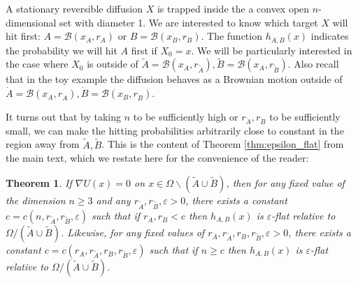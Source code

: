 \documentclass[12pt, nofootinbib,english, amsmath, amssymb, aps, priprint, graphicx,floatfix]{revtex4-1}
\newtheorem{theorem}{Theorem}
\theoremstyle{plain}
\theoremstyle{definition}
\theoremstyle{plain}
\newcommand{\bb}[1]{\mathcal{B}\left(#1\right)}
\newcommand{\dA}{{\dot A}}
\newcommand{\tA}{{\tilde A}}
\newcommand{\dB}{{\dot B}}
\newcommand{\tB}{{\tilde B}}
\begin{document}
A stationary reversible diffusion $X$ is trapped inside the a convex open $n$-dimensional set with diameter 1.  We are interested to know which target $X$ will hit first: $A=\bb{x_A,r_A}$ or $B=\bb{x_B,r_B}$.  The function $h_{A,B}(x)$ indicates the probability we will hit $A$ first if $X_0=x$.  We will be particularly interested in the case where $X_0$ is outside of $\tilde A=\bb{x_A,r_{\tilde A}},\tilde B=\bb{x_A,r_{\tilde B}}$.  Also recall that in the toy example the diffusion behaves as a Brownian motion outside of $\dot A=\bb{x_A,r_{\dot A}},\dot B=\bb{x_B,r_{\dot B}}$.  

It turns out that by taking $n$ to be sufficiently high or $r_{\dot A},r_{\dot B}$ to be sufficiently small, we can make the hitting probabilities arbitrarily close to constant in the region away from $\tilde A,\tilde B$.  This is the content of Theorem \ref{thm:epsilon_flat} from the main text, which we restate here for the convenience of the reader:

\begingroup
\def\thetheorem{\ref{thm:epsilon_flat}}
\begin{theorem}  
If $\nabla U(x)=0$ on $x\in\Omega\backslash(\tA\cup\tB)$, then
for any fixed value of the dimension $n \geq 3$ and any $r_{\tilde{A}}, r_{\tilde{B}}, \varepsilon > 0$, there exists a constant $c=c(n, r_{\tilde{A}}, r_{\tilde{B}}, \varepsilon)$ such that if $r_{\dA}, r_{\dB} < c$ then 
$h_{A,B}(x)$ is 
$\varepsilon$-flat  relative to 
$\Omega / (\tilde{A} \cup \tilde{B})$.  
Likewise, for any fixed values of $r_{\dA}, r_{\tilde{A}}, r_{\dB}, r_{\tilde{B}}, \varepsilon>0$, there exists a constant $c=c(r_\dA, r_{\tilde{A}}, r_\dB, r_{\tilde{B}}, \varepsilon)$ such that if $n \geq c$ then 
$h_{A,B}(x)$ is
$\varepsilon$-flat relative to 
$\Omega / (\tilde{A} \cup \tilde{B})$. 
\end{theorem}
\addtocounter{theorem}{-1}
\endgroup
\end{document}
